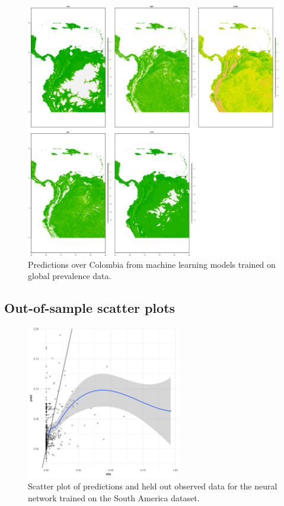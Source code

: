 \documentclass[review]{elsarticle}
\begin{document}
\begin{figure}[h!]
  \centering
  \includegraphics[width=1\textwidth]{figs/SI/COL_all_globalml.png}
\caption{
  Predictions over Colombia from machine learning models trained on global prevalence data.
}

\end{figure}




\clearpage
\subsection{Out-of-sample scatter plots}


\begin{figure}[h!]
  \centering
  \includegraphics[width=0.6\textwidth]{figs/SI/nnet_obspred_sa.png}
\caption{
  Scatter plot of predictions and held out observed data for the neural network trained on the South America dataset.
}

\end{figure}
\end{document}
